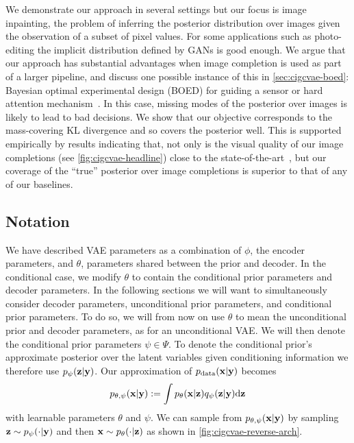We demonstrate our approach in several settings but our focus is image inpainting, the problem of inferring the posterior distribution over images given the observation of a subset of pixel values. For some applications such as photo-editing the implicit distribution defined by GANs is good enough. We argue that our approach has substantial advantages when
image completion is used as part of a larger pipeline, and discuss one possible
instance of this in \cref{sec:cigcvae-boed}: Bayesian optimal experimental design (BOED)
for guiding a sensor or hard attention
mechanism~\citep{ma2018eddi,harvey2019near,rangrej2021achieving}. In this case,
missing modes of the posterior over images is likely to lead to bad decisions.
We show that our objective corresponds to the mass-covering KL divergence and so
covers the posterior well. This is supported empirically by results indicating that, not only is the visual quality of our image completions (see \cref{fig:cigcvae-headline}) close to the
state-of-the-art~\citep{zhao2021large}, but our coverage of the ``true''
posterior over image completions is superior to that of any of our baselines.


\subsection{Notation}
We have described VAE parameters as a combination of $\phi$, the encoder parameters, and $\theta$, parameters shared between the prior and decoder. In the conditional case, we modify $\theta$ to contain the conditional prior parameters and decoder parameters. In the following sections we will want to simultaneously consider decoder parameters, unconditional prior parameters, and conditional prior parameters. To do so, we will from now on use $\theta$ to mean the unconditional prior and decoder parameters, as for an unconditional VAE. We will then denote the conditional prior parameters $\psi \in \Psi$.
To denote the conditional prior's approximate posterior over the latent variables given conditioning information we therefore use $p_\psi({\mathbf{z}}|{\mathbf{y}})$.
%
Our approximation of $p_{\rm{data}}({\mathbf{x}}|{\mathbf{y}})$ becomes
\begin{equation}
  \label{eq:marginal-image-posterior}
  p_{\theta,\psi}({\mathbf{x}}|{\mathbf{y}}) := \int p_\theta({\mathbf{x}}|{\mathbf{z}})q_\psi({\mathbf{z}}|{\mathbf{y}}) \mathrm{d}{\mathbf{z}}
\end{equation}
with learnable parameters $\theta$ and $\psi$. We can sample from
$p_{\theta,\psi}({\mathbf{x}}|{\mathbf{y}})$ by sampling ${\mathbf{z}}\sim p_\psi(\cdot|{\mathbf{y}})$ and then
${\mathbf{x}}\sim p_\theta(\cdot|{\mathbf{z}})$ as shown in \cref{fig:cigcvae-reverse-arch}. 
%

